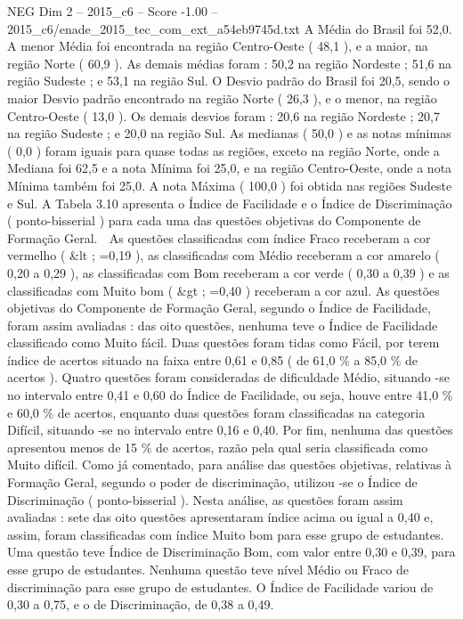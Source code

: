 \begin{textsample}{NEG Dim 2 – 2015\_c6 – Score -1.00 – 2015\_c6/enade\_2015\_tec\_com\_ext\_a54eb9745d.txt}
A Média do Brasil foi 52,0.
A menor Média foi encontrada na região Centro-Oeste ( 48,1 ), e a maior, na região Norte ( 60,9 ).
As demais médias foram : 50,2 na região Nordeste ; 51,6 na região Sudeste ; e 53,1 na região Sul.
O Desvio padrão do Brasil foi 20,5, sendo o maior Desvio padrão encontrado na região Norte ( 26,3 ), e o menor, na região Centro-Oeste ( 13,0 ).
Os demais desvios foram : 20,6 na região Nordeste ; 20,7 na região Sudeste ; e 20,0 na região Sul.
As medianas ( 50,0 ) e as notas mínimas ( 0,0 ) foram iguais para quase todas as regiões, exceto na região Norte, onde a Mediana foi 62,5 e a nota Mínima foi 25,0, e na região Centro-Oeste, onde a nota Mínima também foi 25,0.
A nota Máxima ( 100,0 ) foi obtida nas regiões Sudeste e Sul.
A Tabela 3.10 apresenta o Índice de Facilidade e o Índice de Discriminação ( ponto-bisserial ) para cada uma das questões objetivas do Componente de Formação Geral.  As questões classificadas com índice Fraco receberam a cor vermelho ( \&lt ; =0,19 ), as classificadas com Médio receberam a cor amarelo ( 0,20 a 0,29 ), as classificadas com Bom receberam a cor verde ( 0,30 a 0,39 ) e as classificadas com Muito bom ( \&gt ; =0,40 ) receberam a cor azul.
As questões objetivas do Componente de Formação Geral, segundo o Índice de Facilidade, foram assim avaliadas : das oito questões, nenhuma teve o Índice de Facilidade classificado como Muito fácil.
Duas questões foram tidas como Fácil, por terem índice de acertos situado na faixa entre 0,61 e 0,85 ( de 61,0 \% a 85,0 \% de acertos ).
Quatro questões foram consideradas de dificuldade Médio, situando -se no intervalo entre 0,41 e 0,60 do Índice de Facilidade, ou seja, houve entre 41,0 \% e 60,0 \% de acertos, enquanto duas questões foram classificadas na categoria Difícil, situando -se no intervalo entre 0,16 e 0,40.
Por fim, nenhuma das questões apresentou menos de 15 \% de acertos, razão pela qual seria classificada como Muito difícil.
Como já comentado, para análise das questões objetivas, relativas à Formação Geral, segundo o poder de discriminação, utilizou -se o Índice de Discriminação ( ponto-bisserial ).
Nesta análise, as questões foram assim avaliadas : sete das oito questões apresentaram índice acima ou igual a 0,40 e, assim, foram classificadas com índice Muito bom para esse grupo de estudantes.
Uma questão teve Índice de Discriminação Bom, com valor entre 0,30 e 0,39, para esse grupo de estudantes.
Nenhuma questão teve nível Médio ou Fraco de discriminação para esse grupo de estudantes.
O Índice de Facilidade variou de 0,30 a 0,75, e o de Discriminação, de 0,38 a 0,49.

\end{textsample}
